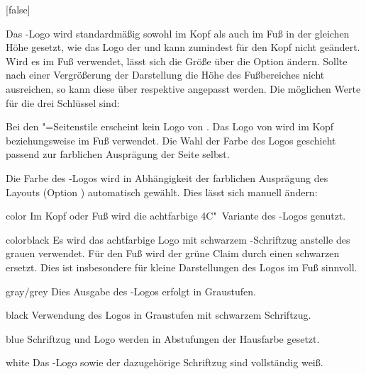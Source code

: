 \begin{Declaration*}{}
\begin{Declaration*}{}
\begin{Declaration*}{}
\begin{Declaration}[%
  v2.02:Logo von \DDC automatisch in Kopf/Fuß;%
  v2.02!\Option{ddc=colorblack};
  v2.02!\Option{ddc=gray};
  v2.02!\Option{ddc=black};
  v2.02!\Option{ddc=blue};
  v2.02!\Option{ddc=white};
]{}[false]
\begin{Declaration}[v2.02]{}
\begin{Declaration}[v2.02]{}
Das \DDC-Logo wird standardmäßig sowohl im Kopf als auch im Fuß in der gleichen 
Höhe gesetzt, wie das Logo der \TnUD und kann zumindest für den Kopf nicht 
geändert. Wird es im Fuß verwendet, lässt sich die Größe über die Option 
 ändern. Sollte nach einer Vergrößerung der Darstellung 
die Höhe des Fußbereiches nicht ausreichen, so kann diese über 
 respektive 
 angepasst werden.
Die möglichen Werte für die drei Schlüssel sind:
%
\begin{values}{}
\itemfalse
  Bei den "=Seitenstile erscheint kein Logo von \DDC.
\itemtrue*
  Das Logo von \DDC wird im Kopf beziehungsweise im Fuß verwendet. Die Wahl der 
  Farbe des Logos geschieht passend zur farblichen Ausprägung der Seite selbst.
\end{values}
%
Die Farbe des \DDC-Logos wird in Abhängigkeit der farblichen Ausprägung des 
Layouts (Option ) automatisch gewählt. Dies lässt sich manuell 
ändern:
%
\begin{values}{}
\item[color]
  Im Kopf oder Fuß wird die achtfarbige 4C"~Variante des \DDC-Logos genutzt.
\item[colorblack]
  Es wird das achtfarbige Logo mit schwarzem \DDC-Schriftzug anstelle des 
  grauen verwendet. Für den Fuß wird der grüne Claim durch einen schwarzen 
  ersetzt. Dies ist insbesondere für kleine Darstellungen des Logos im Fuß 
  sinnvoll.
\item[gray/grey]
  Dies Ausgabe des \DDC-Logos erfolgt in Graustufen.
\item[black]
  Verwendung des Logos in Graustufen mit schwarzem Schriftzug.
\item[blue]
  Schriftzug und Logo werden in Abstufungen der Hausfarbe  gesetzt.
\item[white]
  Das \DDC-Logo sowie der dazugehörige Schriftzug sind vollständig weiß.
\end{values}
%
\end{Declaration}
\end{Declaration}
\end{Declaration}


\end{Declaration*}
\end{Declaration*}
\end{Declaration*}
